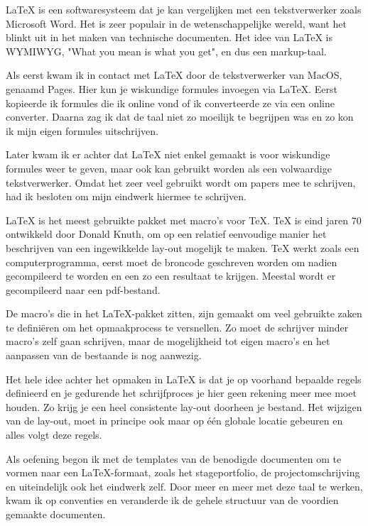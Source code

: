 \LaTeX{} is een softwaresysteem dat je kan vergelijken met een tekstverwerker zoals Microsoft Word. Het is zeer populair in de wetenschappelijke wereld, want het blinkt uit in het maken van technische documenten. Het idee van \LaTeX{} is WYMIWYG, "What you mean is what you get", en dus een markup\hyp{}taal.

Als eerst kwam ik in contact met \LaTeX{} door de tekstverwerker van MacOS, genaamd Pages. Hier kun je wiskundige formules invoegen via \LaTeX{}. Eerst kopieerde ik formules die ik online vond of ik converteerde ze via een online converter. Daarna zag ik dat de taal niet zo moeilijk te begrijpen was en zo kon ik mijn eigen formules uitschrijven.

Later kwam ik er achter dat \LaTeX{} niet enkel gemaakt is voor wiskundige formules weer te geven, maar ook kan gebruikt worden als een volwaardige tekstverwerker. Omdat het zeer veel gebruikt wordt om papers mee te schrijven, had ik besloten om mijn eindwerk hiermee te schrijven.

\LaTeX{} is het meest gebruikte pakket met macro's voor \TeX{}. \TeX{} is eind jaren 70 ontwikkeld door Donald Knuth, om op een relatief eenvoudige manier het beschrijven van een ingewikkelde lay\hyp{}out mogelijk te maken. \TeX{} werkt zoals een computerprogramma, eerst moet de broncode geschreven worden om nadien gecompileerd te worden en een zo een resultaat te krijgen. Meestal wordt er gecompileerd naar een pdf\hyp{}bestand.

De macro's die in het \LaTeX\hyp{}pakket zitten, zijn gemaakt om veel gebruikte zaken te defini\"eren om het opmaakprocess te versnellen. Zo moet de schrijver minder macro's zelf gaan schrijven, maar de mogelijkheid tot eigen macro's en het aanpassen van de bestaande is nog aanwezig.

Het hele idee achter het opmaken in \LaTeX{} is dat je op voorhand bepaalde regels definieerd en je gedurende het schrijfproces je hier geen rekening meer mee moet houden. Zo krijg je een heel consistente lay\hyp{}out doorheen je bestand. Het wijzigen van de lay\hyp{}out, moet in principe ook maar op één globale locatie gebeuren en alles volgt deze regels.

Als oefening begon ik met de templates van de benodigde documenten om te vormen naar een \LaTeX\hyp{}formaat, zoals het stageportfolio, de projectomschrijving en uiteindelijk ook het eindwerk zelf. Door meer en meer met deze taal te werken, kwam ik op conventies en veranderde ik de gehele structuur van de voordien gemaakte documenten.


